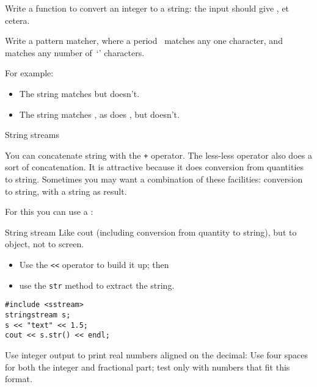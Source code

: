 \begin{exercise}
  \label{ex:printnumber}
  Write a function to convert an integer to a string: the input
   should give , et cetera.
\end{exercise}

\begin{exercise}
  Write a pattern matcher, where a period~ matches any one
  character, and  matches any number of~`' characters.

  For example:
  \begin{itemize}
  \item The string  matches  but  doesn't.
  \item The string  matches , as does , but
     doesn't.
  \end{itemize}
\end{exercise}

 {String streams}
\label{sec:stringstream}

You can concatenate string with the \lstinline{+} operator.
The less-less operator also does a sort of concatenation. It is
attractive because it does conversion from quantities to string.
Sometimes you may want a combination of these facilities: conversion
to string, with a string as result.

For this you can use a : 

\begin{block}{String stream}
  \label{sl:sstream}
  Like cout (including conversion from quantity to string), but to
  object, not to screen.
\begin{itemize}
\item Use the \lstinline{<<} operator to build it up; then
\item use the \lstinline{str} method to extract the string.
\end{itemize}
\begin{lstlisting}
#include <sstream>
stringstream s;
s << "text" << 1.5;
cout << s.str() << endl;
\end{lstlisting}
\end{block}

\begin{exercise}
  \label{ex:fixedpout}
  Use integer output to print real numbers aligned on the
  decimal:
  Use four spaces for both the integer and fractional part; test only
  with numbers that fit this format.
\end{exercise}

